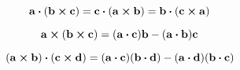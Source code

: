 \begin{equation}
  \label{app:eqn:vdot_cp}
  \vb{a}\vdot(\vb{b}\cp\vb{c})=\vb{c}\vdot(\vb{a}\cp\vb{b})=\vb{b}\vdot(\vb{c}\cp\vb{a})
\end{equation}


\begin{equation}
  \label{app:eqn:cp_cp}
  \vb{a}\cp(\vb{b}\cp\vb{c})=(\vb{a}\vdot\vb{c})\vb{b}-(\vb{a}\vdot\vb{b})\vb{c}
\end{equation}


\begin{equation}
  \label{app:eqn:cp_vdot_cp}
  (\vb{a}\cp\vb{b})\vdot(\vb{c}\cp\vb{d})=(\vb{a}\vdot\vb{c})(\vb{b}\vdot\vb{d})-(\vb{a}\vdot\vb{d})(\vb{b}\vdot\vb{c})
\end{equation}
